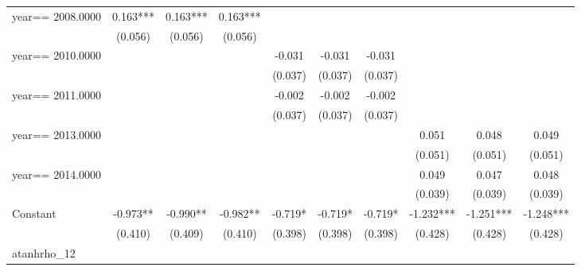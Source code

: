 \begin{table}[htbp]
\begin{tabular}{l*{9}{c}}
year==  2008.0000   &       0.163***&       0.163***&       0.163***&               &               &               &               &               &               \\
                    &     (0.056)   &     (0.056)   &     (0.056)   &               &               &               &               &               &               \\
year==  2010.0000   &               &               &               &      -0.031   &      -0.031   &      -0.031   &               &               &               \\
                    &               &               &               &     (0.037)   &     (0.037)   &     (0.037)   &               &               &               \\
year==  2011.0000   &               &               &               &      -0.002   &      -0.002   &      -0.002   &               &               &               \\
                    &               &               &               &     (0.037)   &     (0.037)   &     (0.037)   &               &               &               \\
year==  2013.0000   &               &               &               &               &               &               &       0.051   &       0.048   &       0.049   \\
                    &               &               &               &               &               &               &     (0.051)   &     (0.051)   &     (0.051)   \\
year==  2014.0000   &               &               &               &               &               &               &       0.049   &       0.047   &       0.048   \\
                    &               &               &               &               &               &               &     (0.039)   &     (0.039)   &     (0.039)   \\
Constant            &      -0.973** &      -0.990** &      -0.982** &      -0.719*  &      -0.719*  &      -0.719*  &      -1.232***&      -1.251***&      -1.248***\\
                    &     (0.410)   &     (0.409)   &     (0.410)   &     (0.398)   &     (0.398)   &     (0.398)   &     (0.428)   &     (0.428)   &     (0.428)   \\
\hline
atanhrho\_12         &               &               &               &               &               &               &               &               &               \\

\end{tabular}
\end{table}
